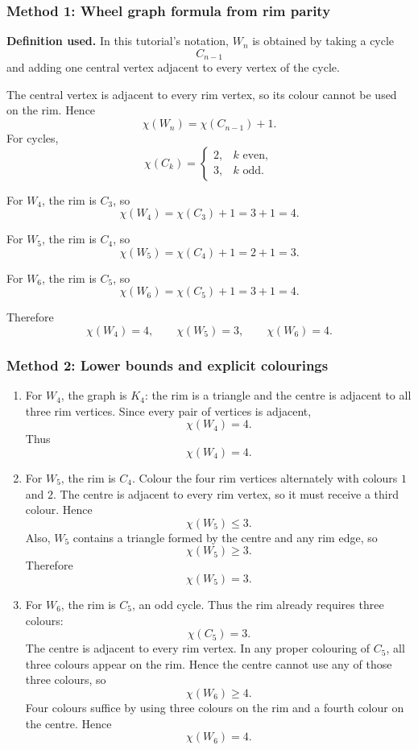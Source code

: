 \documentclass[12pt]{article}
\begin{document}
\subsubsection{Method 1: Wheel graph formula from rim parity}
\textbf{Definition used.} In this tutorial's notation, $W_n$ is obtained by taking a cycle
\[
  C_{n-1}
\]
and adding one central vertex adjacent to every vertex of the cycle.

The central vertex is adjacent to every rim vertex, so its colour cannot be used on the rim. Hence
\[
  \chi(W_n)=\chi(C_{n-1})+1.
\]
For cycles,
\[
  \chi(C_k)=
  \begin{cases}
  2, & k\text{ even},\\
  3, & k\text{ odd}.
  \end{cases}
\]

For $W_4$, the rim is $C_3$, so
\[
  \chi(W_4)=\chi(C_3)+1=3+1=4.
\]

For $W_5$, the rim is $C_4$, so
\[
  \chi(W_5)=\chi(C_4)+1=2+1=3.
\]

For $W_6$, the rim is $C_5$, so
\[
  \chi(W_6)=\chi(C_5)+1=3+1=4.
\]

Therefore
\[
  \boxed{\chi(W_4)=4,\qquad \chi(W_5)=3,\qquad \chi(W_6)=4.}
\]

\subsubsection{Method 2: Lower bounds and explicit colourings}
\begin{enumerate}[label=(\alph*)]
  \item For $W_4$, the graph is $K_4$: the rim is a triangle and the centre is adjacent to all three rim vertices. Since every pair of vertices is adjacent,
  \[
    \chi(W_4)=4.
  \]
  Thus
  \[
    \boxed{\chi(W_4)=4.}
  \]

  \item For $W_5$, the rim is $C_4$. Colour the four rim vertices alternately with colours $1$ and $2$. The centre is adjacent to every rim vertex, so it must receive a third colour. Hence
  \[
    \chi(W_5)\le 3.
  \]
  Also, $W_5$ contains a triangle formed by the centre and any rim edge, so
  \[
    \chi(W_5)\ge 3.
  \]
  Therefore
  \[
    \boxed{\chi(W_5)=3.}
  \]

  \item For $W_6$, the rim is $C_5$, an odd cycle. Thus the rim already requires three colours:
  \[
    \chi(C_5)=3.
  \]
  The centre is adjacent to every rim vertex. In any proper colouring of $C_5$, all three colours appear on the rim. Hence the centre cannot use any of those three colours, so
  \[
    \chi(W_6)\ge 4.
  \]
  Four colours suffice by using three colours on the rim and a fourth colour on the centre. Hence
  \[
    \boxed{\chi(W_6)=4.}
  \]
\end{enumerate}
\end{document}
